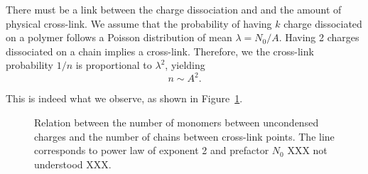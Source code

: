 \documentclass[12pt,a4paper]{article}
\begin{document}
There must be a link between the charge dissociation and and the amount of physical cross-link. We assume that the probability of having $k$ charge dissociated on a polymer follows a Poisson distribution of mean $\lambda = N_0/A$. Having 2 charges dissociated on a chain implies a cross-link. Therefore, we the cross-link probability $1/n$ is proportional to $\lambda^2$, yielding
\begin{equation}
n \sim A^2.
\end{equation}

This is indeed what we observe, as shown in Figure~\ref{fig:nA}.

\begin{figure}
\begin{center}
\end{center}
\caption{Relation between the number of monomers between uncondensed charges and the number of chains between cross-link points. The line corresponds to power law of exponent 2 and prefactor $N_0$ XXX not understood XXX.}
\label{fig:nA}
\end{figure}
\end{document}

